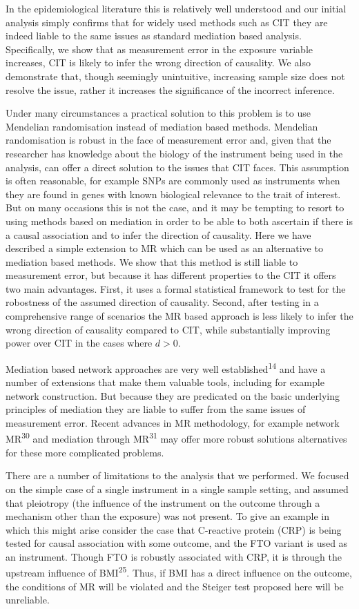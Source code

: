 \documentclass[]{article}
\begin{document}
In the epidemiological literature this is relatively well understood and
our initial analysis simply confirms that for widely used methods such
as CIT they are indeed liable to the same issues as standard mediation
based analysis. Specifically, we show that as measurement error in the
exposure variable increases, CIT is likely to infer the wrong direction
of causality. We also demonstrate that, though seemingly unintuitive,
increasing sample size does not resolve the issue, rather it increases
the significance of the incorrect inference.

Under many circumstances a practical solution to this problem is to use
Mendelian randomisation instead of mediation based methods. Mendelian
randomisation is robust in the face of measurement error and, given that
the researcher has knowledge about the biology of the instrument being
used in the analysis, can offer a direct solution to the issues that CIT
faces. This assumption is often reasonable, for example SNPs are
commonly used as instruments when they are found in genes with known
biological relevance to the trait of interest. But on many occasions
this is not the case, and it may be tempting to resort to using methods
based on mediation in order to be able to both ascertain if there is a
causal association and to infer the direction of causality. Here we have
described a simple extension to MR which can be used as an alternative
to mediation based methods. We show that this method is still liable to
measurement error, but because it has different properties to the CIT it
offers two main advantages. First, it uses a formal statistical
framework to test for the robostness of the assumed direction of
causality. Second, after testing in a comprehensive range of scenarios
the MR based approach is less likely to infer the wrong direction of
causality compared to CIT, while substantially improving power over CIT
in the cases where \(d > 0\).

Mediation based network approaches are very well
established\textsuperscript{14} and have a number of extensions that
make them valuable tools, including for example network construction.
But because they are predicated on the basic underlying principles of
mediation they are liable to suffer from the same issues of measurement
error. Recent advances in MR methodology, for example network
MR\textsuperscript{30} and mediation through MR\textsuperscript{31} may
offer more robust solutions alternatives for these more complicated
problems.

There are a number of limitations to the analysis that we performed. We
focused on the simple case of a single instrument in a single sample
setting, and assumed that pleiotropy (the influence of the instrument on
the outcome through a mechanism other than the exposure) was not
present. To give an example in which this might arise consider the case
that C-reactive protein (CRP) is being tested for causal association
with some outcome, and the FTO variant is used as an instrument. Though
FTO is robustly associated with CRP, it is through the upstream
influence of BMI\textsuperscript{25}. Thus, if BMI has a direct
influence on the outcome, the conditions of MR will be violated and the
Steiger test proposed here will be unreliable.
\end{document}
